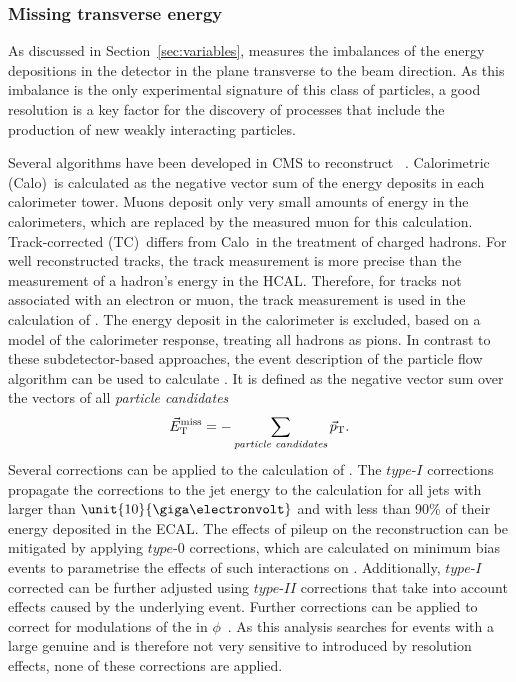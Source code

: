 \subsubsection{Missing transverse energy}
As discussed in Section~\ref{sec:variables}, \MET measures the imbalances of the energy depositions in the detector in the plane transverse to the beam direction. As this imbalance is the only experimental signature of this class of particles, a good \MET resolution is a key factor for the discovery of processes that include the production of new weakly interacting particles. 

Several algorithms have been developed in CMS to reconstruct \MET~\cite{7TeVMETPaper}. Calorimetric (Calo)~\METVec is calculated as the negative vector sum of the energy deposits in each calorimeter tower. Muons deposit only very small amounts of energy in the calorimeters, which are replaced by the measured muon \pt for this calculation.  Track-corrected (TC)~\METVec differs from Calo~\METVec in the treatment of charged hadrons. For well reconstructed tracks, the track measurement is more precise than the measurement of a hadron's energy in the HCAL. Therefore, for tracks not associated with an electron or  muon, the track measurement is used in the calculation of \METVec. The energy deposit in the calorimeter is excluded, based on a model of the calorimeter response, treating all hadrons as pions. In contrast to these subdetector-based approaches, the event description of the particle flow algorithm can be used to calculate \METVec. It is defined as the negative vector sum over the \pt vectors of all \textit{particle candidates}
\begin{equation}
 \vec{E}_{\mathrm{T}}^{\mathrm{miss}} = - \sum\limits_{\textit{particle candidates}} \vec{p}_\mathrm{T}.
\end{equation}
Several corrections can be applied to the calculation of \MET. The $\textit{type-I}$ corrections propagate the corrections to the jet energy to the \MET calculation for all jets with \pt larger than $\unit{10}{\giga\electronvolt}$ and with less than 90\% of their energy deposited in the ECAL. The effects of pileup on the \MET reconstruction can be mitigated by applying $\textit{type-0}$ corrections, which are calculated on minimum bias events to parametrise the effects of such interactions on \MET. Additionally, $\textit{type-I}$ corrected \MET can be further adjusted using $\textit{type-II}$ corrections that take into account effects caused by the underlying event. Further corrections can be applied to correct for modulations of the \MET in $\phi$~\cite{CMS-PAS-JME-12-002}. As this analysis searches for events with a large genuine \MET and is therefore not very sensitive to \MET introduced by resolution effects, none of these corrections are applied. 

